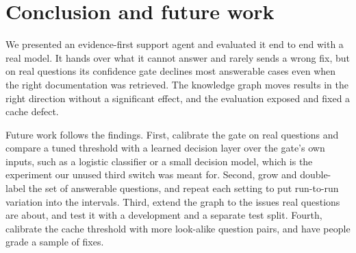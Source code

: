 \documentclass[cameraready]{ieeeconf}
\begin{document}
\section{Conclusion and future work}
We presented an evidence-first support agent and evaluated it end to end with a real model. It hands over what it cannot answer and rarely sends a wrong fix, but on real questions its confidence gate declines most answerable cases even when the right documentation was retrieved. The knowledge graph moves results in the right direction without a significant effect, and the evaluation exposed and fixed a cache defect.

Future work follows the findings. First, calibrate the gate on real questions and compare a tuned threshold with a learned decision layer over the gate's own inputs, such as a logistic classifier or a small decision model, which is the experiment our unused third switch was meant for. Second, grow and double-label the set of answerable questions, and repeat each setting to put run-to-run variation into the intervals. Third, extend the graph to the issues real questions are about, and test it with a development and a separate test split. Fourth, calibrate the cache threshold with more look-alike question pairs, and have people grade a sample of fixes.



\end{document}
